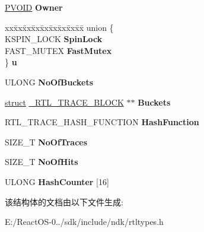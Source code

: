 \begin{DoxyCompactItemize}
\hyperlink{interfacevoid}{P\+V\+O\+ID} {\bfseries Owner}
\item 
\mbox{\label{struct___r_t_l___t_r_a_c_e___d_a_t_a_b_a_s_e_a4a39442e95d3fe913cfc545503037807}} 
\begin{tabbing}
xx\=xx\=xx\=xx\=xx\=xx\=xx\=xx\=xx\=\kill
union \{\\
\>KSPIN\_LOCK {\bfseries SpinLock}\\
\>FAST\_MUTEX {\bfseries FastMutex}\\
\} {\bfseries u}\\

\end{tabbing}\item 
\mbox{\label{struct___r_t_l___t_r_a_c_e___d_a_t_a_b_a_s_e_ac70658e1f269f6612378b44d547d3a0b}} 
U\+L\+O\+NG {\bfseries No\+Of\+Buckets}
\item 
\mbox{\label{struct___r_t_l___t_r_a_c_e___d_a_t_a_b_a_s_e_a1604c3d50e762c08c963e84e02e16429}} 
\hyperlink{interfacestruct}{struct} \hyperlink{struct___r_t_l___t_r_a_c_e___b_l_o_c_k}{\+\_\+\+R\+T\+L\+\_\+\+T\+R\+A\+C\+E\+\_\+\+B\+L\+O\+CK} $\ast$$\ast$ {\bfseries Buckets}
\item 
\mbox{\label{struct___r_t_l___t_r_a_c_e___d_a_t_a_b_a_s_e_a68d718a840d44ce3d661b78eb68981a0}} 
R\+T\+L\+\_\+\+T\+R\+A\+C\+E\+\_\+\+H\+A\+S\+H\+\_\+\+F\+U\+N\+C\+T\+I\+ON {\bfseries Hash\+Function}
\item 
\mbox{\label{struct___r_t_l___t_r_a_c_e___d_a_t_a_b_a_s_e_ae39b10ee47cc9f10c8dfdeb61ee57d12}} 
S\+I\+Z\+E\+\_\+T {\bfseries No\+Of\+Traces}
\item 
\mbox{\label{struct___r_t_l___t_r_a_c_e___d_a_t_a_b_a_s_e_afec762c3786769d699210c4d4276fd88}} 
S\+I\+Z\+E\+\_\+T {\bfseries No\+Of\+Hits}
\item 
\mbox{\label{struct___r_t_l___t_r_a_c_e___d_a_t_a_b_a_s_e_a4ec944cb0fe5aed9d0b1e68fe0a3f980}} 
U\+L\+O\+NG {\bfseries Hash\+Counter} \mbox{[}16\mbox{]}
\end{DoxyCompactItemize}


该结构体的文档由以下文件生成\+:\begin{DoxyCompactItemize}
\item 
E\+:/\+React\+O\+S-\/0../sdk/include/ndk/rtltypes.\+h\end{DoxyCompactItemize}
